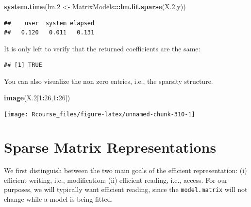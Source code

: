 \documentclass[]{book}
\newenvironment{Shaded}{\begin{snugshade}}{\end{snugshade}}
\newcommand{\KeywordTok}[1]{\textcolor[rgb]{0.13,0.29,0.53}{\textbf{#1}}}
\newcommand{\DataTypeTok}[1]{\textcolor[rgb]{0.13,0.29,0.53}{#1}}
\newcommand{\DecValTok}[1]{\textcolor[rgb]{0.00,0.00,0.81}{#1}}
\newcommand{\FloatTok}[1]{\textcolor[rgb]{0.00,0.00,0.81}{#1}}
\newcommand{\StringTok}[1]{\textcolor[rgb]{0.31,0.60,0.02}{#1}}
\newcommand{\OperatorTok}[1]{\textcolor[rgb]{0.81,0.36,0.00}{\textbf{#1}}}
\newcommand{\NormalTok}[1]{#1}
\theoremstyle{definition}
\theoremstyle{definition}
\theoremstyle{definition}
\theoremstyle{remark}
\begin{document}
\begin{Shaded}
\begin{Highlighting}[]
\KeywordTok{system.time}\NormalTok{(lm.}\DecValTok{2}\NormalTok{ <-}\StringTok{ }\NormalTok{MatrixModels}\OperatorTok{:::}\KeywordTok{lm.fit.sparse}\NormalTok{(X.}\DecValTok{2}\NormalTok{,y))}
\end{Highlighting}
\end{Shaded}

\begin{verbatim}
##    user  system elapsed 
##   0.120   0.011   0.131
\end{verbatim}

It is only left to verify that the returned coefficients are the same:

\begin{Shaded}
\end{Shaded}

\begin{verbatim}
## [1] TRUE
\end{verbatim}

You can also visualize the non zero entries, i.e., the sparsity
structure.

\begin{Shaded}
\begin{Highlighting}[]
\KeywordTok{image}\NormalTok{(X.}\DecValTok{2}\NormalTok{[}\DecValTok{1}\OperatorTok{:}\DecValTok{26}\NormalTok{,}\DecValTok{1}\OperatorTok{:}\DecValTok{26}\NormalTok{])}
\end{Highlighting}
\end{Shaded}

\texttt{[image: Rcourse\_files/figure-latex/unnamed-chunk-310-1]}

\section{Sparse Matrix
Representations}\label{sparse-matrix-representations}

We first distinguish between the two main goals of the efficient
representation: (i) efficient writing, i.e., modification; (ii)
efficient reading, i.e., access. For our purposes, we will typically
want efficient reading, since the \texttt{model.matrix} will not change
while a model is being fitted.
\end{document}
